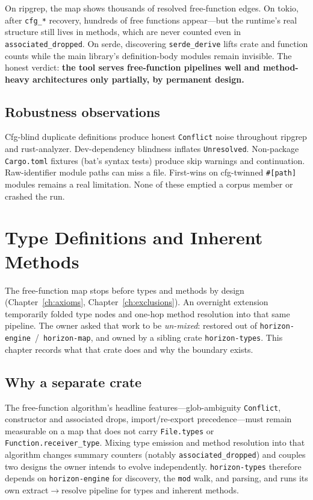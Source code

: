 \documentclass[11pt,a4paper,oneside]{report}
\begin{document}
On ripgrep, the map shows thousands of resolved free-function edges. On
tokio, after \texttt{cfg\_*} recovery, hundreds of free functions appear---but
the runtime's real structure still lives in methods, which are never counted
even in \texttt{associated\_dropped}. On serde, discovering
\texttt{serde\_derive} lifts crate and function counts while the main
library's definition-body modules remain invisible. The honest verdict:
\textbf{the tool serves free-function pipelines well and method-heavy
architectures only partially, by permanent design.}

\section{Robustness observations}

Cfg-blind duplicate definitions produce honest \texttt{Conflict} noise
throughout ripgrep and rust-analyzer. Dev-dependency blindness inflates
\texttt{Unresolved}. Non-package \texttt{Cargo.toml} fixtures (bat's syntax
tests) produce skip warnings and continuation. Raw-identifier module paths
can miss a file. First-wins on cfg-twinned \texttt{\#[path]} modules remains
a real limitation. None of these emptied a corpus member or crashed the run.

\chapter{Type Definitions and Inherent Methods}
\label{ch:types}

The free-function map stops before types and methods by design
(Chapter~\ref{ch:axioms}, Chapter~\ref{ch:exclusions}). An overnight extension
temporarily folded type nodes and one-hop method resolution into that same
pipeline. The owner asked that work to be \emph{un-mixed}: restored out of
\texttt{horizon-engine}~/~\texttt{horizon-map}, and owned by a sibling crate
\texttt{horizon-types}. This chapter records what that crate does and why the
boundary exists.

\section{Why a separate crate}

The free-function algorithm's headline features---glob-ambiguity
\texttt{Conflict}, constructor and associated drops, import/re-export
precedence---must remain measurable on a map that does not carry
\texttt{File.types} or \texttt{Function.receiver\_type}. Mixing type emission
and method resolution into that algorithm changes summary counters (notably
\texttt{associated\_dropped}) and couples two designs the owner intends to
evolve independently. \texttt{horizon-types} therefore depends on
\texttt{horizon-engine} for discovery, the \texttt{mod} walk, and parsing, and
runs its own extract$\to$resolve pipeline for types and inherent methods.
\end{document}
